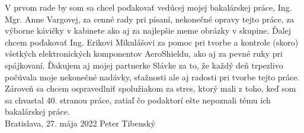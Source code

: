 \null
\vfill
\noindent

V prvom rade by som sa chcel poďakovať vedúcej mojej bakalárskej práce, Ing. Mgr. Anne Vargovej, za cenné rady pri písaní, nekonečné opravy tejto práce, za výborne kávičky v kabinete ako aj za najlepšie meme obrázky v skupine. Ďalej chcem poďakovať Ing. Erikovi Mikulášovi za pomoc pri tvorbe a kontrole (skoro) všetkých elektronických komponentov AeroShieldu, ako aj za pevné ruky pri spájkovaní. Ďakujem aj mojej partnerke Slávke za to, že každý deň trpezlivo počúvala moje nekonečné nadávky, sťažnosti ale aj radosti pri tvorbe tejto práce. Zároveň sa chcem ospravedlniť spolužiakom za stres, ktorý mali z toho, keď som sa chvastal 40. stranou práce, zatiaľ čo podaktorí ešte nepoznali tému ich bakalárskej práce.\\

\noindent Bratislava, 27. mája 2022 \hfill  Peter Tibenský
\cleardoublepage


	

